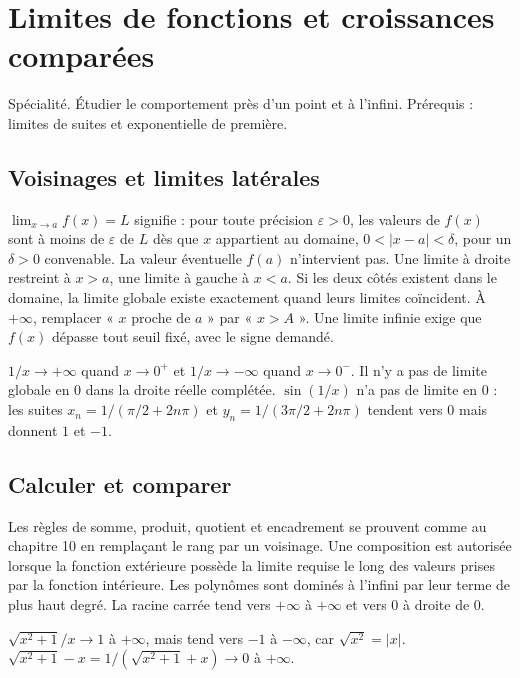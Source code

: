 \documentclass[../cours_tle.tex]{subfiles}
\begin{document}
\setcounter{chapter}{11}
\chapter{Limites de fonctions et croissances comparées}
\label{ch:12}
\begin{objectif}
Spécialité. Étudier le comportement près d'un point et à l'infini. Prérequis : limites de suites et exponentielle de première.
\end{objectif}
\section{Voisinages et limites latérales}
$\lim_{x\to a}f(x)=L$ signifie : pour toute précision $\varepsilon>0$, les valeurs de $f(x)$ sont à moins de $\varepsilon$ de $L$ dès que $x$ appartient au domaine, $0<|x-a|<\delta$, pour un $\delta>0$ convenable.
La valeur éventuelle $f(a)$ n'intervient pas. Une limite à droite restreint à $x>a$, une limite à gauche à $x<a$. Si les deux côtés existent dans le domaine, la limite globale existe exactement quand leurs limites coïncident.
À $+\infty$, remplacer « $x$ proche de $a$ » par « $x>A$ ». Une limite infinie exige que $f(x)$ dépasse tout seuil fixé, avec le signe demandé.
\begin{exemple}
$1/x\to+\infty$ quand $x\to0^+$ et $1/x\to-\infty$ quand $x\to0^-$. Il n'y a pas de limite globale en $0$ dans la droite réelle complétée.
$\sin(1/x)$ n'a pas de limite en $0$ : les suites $x_n=1/(\pi/2+2n\pi)$ et $y_n=1/(3\pi/2+2n\pi)$ tendent vers $0$ mais donnent $1$ et $-1$.
\end{exemple}
\section{Calculer et comparer}
Les règles de somme, produit, quotient et encadrement se prouvent comme au chapitre 10 en remplaçant le rang par un voisinage. Une composition est autorisée lorsque la fonction extérieure possède la limite requise le long des valeurs prises par la fonction intérieure.
Les polynômes sont dominés à l'infini par leur terme de plus haut degré. La racine carrée tend vers $+\infty$ à $+\infty$ et vers $0$ à droite de $0$.
\begin{exemple}
$\sqrt{x^2+1}/x\to1$ à $+\infty$, mais tend vers $-1$ à $-\infty$, car $\sqrt{x^2}=|x|$.
$\sqrt{x^2+1}-x=1/(\sqrt{x^2+1}+x)\to0$ à $+\infty$.
\end{exemple}
\end{document}
